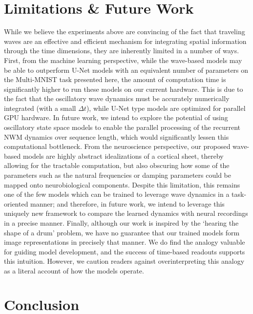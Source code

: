 \section{Limitations \& Future Work}
While we believe the experiments above are convincing of the fact that traveling waves are an effective and efficient mechanism for integrating spatial information through the time dimensions, they are inherently limited in a number of ways. First, from the machine learning perspective, while the wave-based models may be able to outperform U-Net models with an equivalent number of parameters on the Multi-MNIST task presented here, the amount of computation time is significantly higher to run these models on our current hardware. This is due to the fact that the oscillatory wave dynamics must be accurately numerically integrated (with a small $\Delta t$), while U-Net type models are optimized for parallel GPU hardware. In future work, we intend to explore the potential of using oscillatory state space models \citep{rusch2025oscillatorystatespacemodels} to enable the parallel processing of the recurrent NWM dynamics over sequence length, which would significantly lessen this computational bottleneck. From the neuroscience perspective, our proposed wave-based models are highly abstract idealizations of a cortical sheet, thereby allowing for the tractable computation, but also obscuring how some of the parameters such as the natural frequencies or damping parameters could be mapped onto neurobiological components. Despite this limitation, this remains one of the few models which can be trained to leverage wave dynamics in a task-oriented manner; and therefore, in future work, we intend to leverage this uniquely new framework to compare the learned dynamics with neural recordings in a precise manner. Finally, although our work is inspired by the ‘hearing the shape of a drum’ problem, we have no guarantee that our trained models form image representations in precisely that manner. We do find the analogy valuable for guiding model development, and the success of time-based readouts supports this intuition. However, we caution readers against overinterpreting this analogy as a literal account of how the models operate. 

\section{Conclusion}

